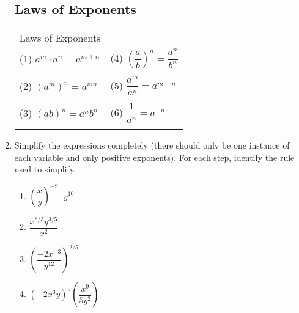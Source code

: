 \begin{enumerate}
\subsection{Laws of Exponents}

\noindent\begin{tabular}{| l  l  |}\hline Laws of Exponents & \\
(1) $a^m \cdot a^n = a^{m+n}$  &(4) $\left(\dfrac{a}{b}\right)^n = \dfrac{a^n}{b^n}$     \\ & \\
(2) $(a^m)^n=a^{mn} $ & (5) $\dfrac{a^m}{a^n}=a^{m-n}$   \\ & \\
(3) $(ab)^n=a^nb^n$ &  (6) $\dfrac{1}{a^n}=a^{-n}$   \\ & \\ \hline
\end{tabular}




\item Simplify the expressions completely (there should only be one instance of each variable and only positive exponents). For each step, identify the rule used to simplify.

\begin{enumerate}



\item $\left(\dfrac{x}{y}\right)^{-9}\cdot y^{10}$ \\[1in]



\item $\dfrac{x^{8/3}y^{3/5}}{x^2}$ \\[1in]

\item $\left( \dfrac{-2x^{-3}}{y^{12} }  \right)^{2/5}$ \vfill

\item $\left(-2x^3y\right)^5 \left(\dfrac{x^9}{5y^2}\right)$ \vfill





%



\end{enumerate}



\end{enumerate}
